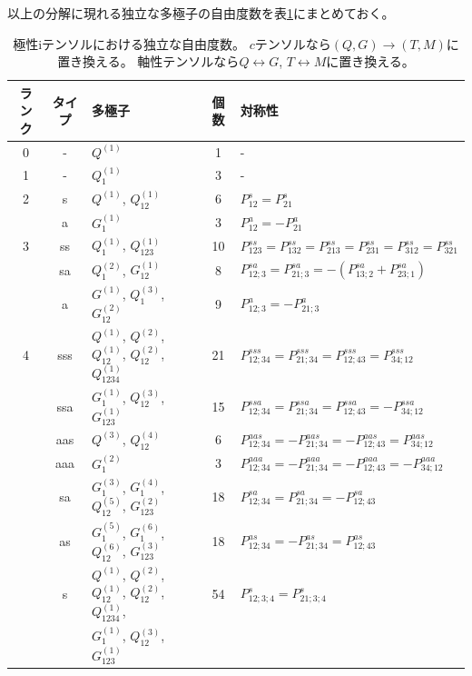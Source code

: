 \documentclass[11pt]{easymemo}
\begin{document}
以上の分解に現れる独立な多極子の自由度数を表\ref{tbl:mulcomp}にまとめておく。

\begin{table}[ht!]
\begin{center}
\caption{極性iテンソルにおける独立な自由度数。
$c$テンソルなら$(Q,G)\to(T,M)$に置き換える。
軸性テンソルなら$Q\leftrightarrow G$, $T\leftrightarrow M$に置き換える。
\label{tbl:mulcomp}}
\renewcommand{\arraystretch}{1.3}
\begin{tabular}{cclcl} \hline \hline
ランク & タイプ & 多極子 & 個数 & 対称性 \\ \hline
0 & - & $Q^{(1)}$ & 1 & - \\ \hline
1 & - & $Q_1^{(1)}$ & 3 & - \\ \hline
2 & s & $Q^{(1)}$, $Q_{12}^{(1)}$ & 6 & $P_{12}^s=P_{21}^s$ \\
  & a & $G_1^{(1)}$ & 3 & $P_{12}^a=-P_{21}^a$ \\ \hline
3 & ss & $Q_1^{(1)}$, $Q_{123}^{(1)}$ & 10 & $P_{123}^{ss}=P_{132}^{ss}=P_{213}^{ss}=P_{231}^{ss}=P_{312}^{ss}=P_{321}^{ss}$ \\
  & sa & $Q_1^{(2)}$, $G_{12}^{(1)}$ & 8 & $P_{12;3}^{sa}=P_{21;3}^{sa}=-(P_{13;2}^{sa}+P_{23;1}^{sa})$ \\
  & a & $G^{(1)}$, $Q_1^{(3)}$, $G_{12}^{(2)}$ & 9 & $P_{12;3}^a=-P_{21;3}^a$ \\ \hline
4 & sss & $Q^{(1)}$, $Q^{(2)}$, $Q_{12}^{(1)}$, $Q_{12}^{(2)}$, $Q_{1234}^{(1)}$ & 21 & $P_{12;34}^{sss}=P_{21;34}^{sss}=P_{12;43}^{sss}=P_{34;12}^{sss}$ \\
  & ssa & $G_1^{(1)}$, $Q_{12}^{(3)}$, $G_{123}^{(1)}$ & 15 & $P_{12;34}^{ssa}=P_{21;34}^{ssa}=P_{12;43}^{ssa}=-P_{34;12}^{ssa}$ \\
  & aas & $Q^{(3)}$, $Q_{12}^{(4)}$ & 6 & $P_{12;34}^{aas}=-P_{21;34}^{aas}=-P_{12;43}^{aas}=P_{34;12}^{aas}$ \\
  & aaa & $G_1^{(2)}$ & 3 & $P_{12;34}^{aaa}=-P_{21;34}^{aaa}=-P_{12;43}^{aaa}=-P_{34;12}^{aaa}$ \\
  & sa & $G_1^{(3)}$, $G_1^{(4)}$, $Q_{12}^{(5)}$, $G_{123}^{(2)}$ & 18 & $P_{12;34}^{sa}=P_{21;34}^{sa}=-P_{12;43}^{sa}$ \\
  & as & $G_1^{(5)}$, $G_1^{(6)}$, $Q_{12}^{(6)}$, $G_{123}^{(3)}$ & 18 & $P_{12;34}^{as}=-P_{21;34}^{as}=P_{12;43}^{as}$ \\
  & s & $Q^{(1)}$, $Q^{(2)}$, $Q_{12}^{(1)}$, $Q_{12}^{(2)}$, $Q_{1234}^{(1)}$, & 54 & $P_{12;3;4}^{s}=P_{21;3;4}^{s}$ \\
  &   & $G_1^{(1)}$, $Q_{12}^{(3)}$, $G_{123}^{(1)}$ \\

\end{tabular}
\end{center}
\end{table}
\end{document}
